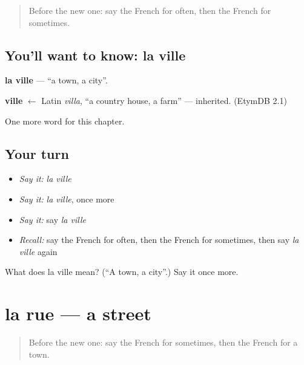 \label{lesson:FR-C98-ville}



\begin{quote}
Before the new one: say the French for often, then the French for sometimes.
\end{quote}

\subsection*{You'll want to know: la ville}
\textbf{la ville} — \textquotedblleft{}a town, a city\textquotedblright{}.

\begin{cousinweb}
\textbf{ville} $\leftarrow$ Latin \emph{villa}, \textquotedblleft{}a country house, a farm\textquotedblright{} — inherited. (EtymDB 2.1)
\end{cousinweb}

\begin{grammarlens}[title={What you've built}]
One more word for this chapter.
\end{grammarlens}

\subsection*{Your turn}
\begin{itemize}
\raggedright
  \item \emph{Say it:} \emph{la ville}
  \item \emph{Say it:} \emph{la ville}, once more
  \item \emph{Say it:} say \emph{la ville}
  \item \emph{Recall:} say the French for often, then the French for sometimes, then say \emph{la ville} again
\end{itemize}

\begin{tcolorbox}[breakable,colback=teal!4,colframe=teal!35!black,title={Before you move on}]
What does la ville mean? (\textquotedblleft{}A town, a city\textquotedblright{}.) Say it once more.
\end{tcolorbox}
\section[la rue]{la rue — a street}

\label{lesson:FR-C98-rue}



\begin{quote}
Before the new one: say the French for sometimes, then the French for a town.
\end{quote}

